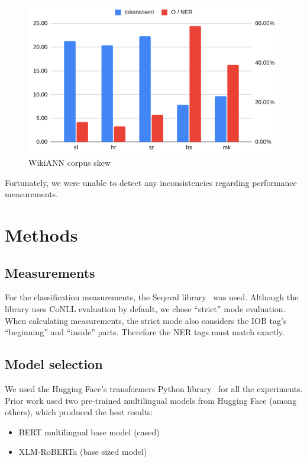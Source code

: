 \documentclass[sigconf]{acmart}
\begin{document}
\begin{figure}[h]
  \caption{WikiANN corpus skew}
  \label{fig:corpora_analysis}
  \centering
  \includegraphics[width=\linewidth]{wikiann-skew}
\end{figure}

Fortunately, we were unable to detect any inconsistencies regarding performance measurements.

\section{Methods}
\label{sec:methods}

\subsection{Measurements}
\label{subsec:measurements}
For the classification measurements, the Seqeval library~\cite{seqeval} was used.
Although the library uses CoNLL evaluation by default, we chose ``strict'' mode evaluation.
When calculating measurements, the strict mode also considers the IOB tag's ``beginning'' and ``inside'' parts.
Therefore the NER tags must match exactly.

\subsection{Model selection}
\label{subsec:model-selection}
We used the Hugging Face's transformers Python library~\cite{wolf-etal-2020-transformers} for all the experiments.
Prior work used two pre-trained multilingual models from Hugging Face (among others), which produced the best results:
\begin{itemize}
  \item BERT multilingual base model (cased)~\cite{DBLP:journals/corr/abs-1810-04805}
  \item XLM-RoBERTa (base sized model)~\cite{DBLP:journals/corr/abs-1911-02116}
\end{itemize}
\end{document}
